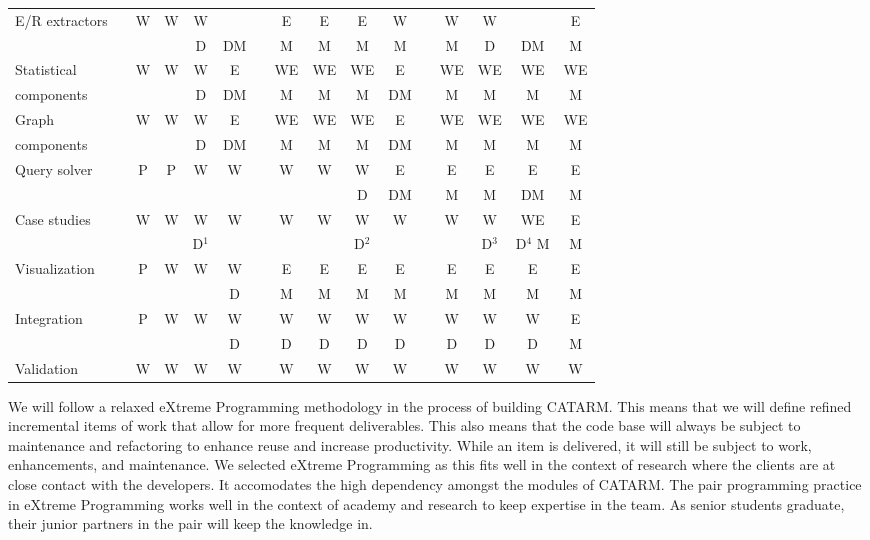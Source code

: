 \documentclass[12pt]{article}
\begin{document}
\begin{table}[bt]
\begin{tabular}{lp{.1cm}ccccp{.1cm}ccccp{.1cm}cccc}
\multirow{2}{*}{E/R extractors} & & 
W & W & W &  & & E & E & E & W & & W & W &  & E \\ 
& & 
 &  & D & DM & & M & M & M & M & & M & D & DM & M \\ \hline

Statistical & & 
W & W & W & E & & WE & WE & WE & E & & WE & WE & WE & WE \\ 
components & & 
 &  & D & DM & & M & M & M & DM & & M & M & M & M \\ \hline

Graph  & & 
W & W & W & E & & WE & WE & WE & E & & WE & WE & WE & WE \\ 
components & & 
 &  & D & DM & & M & M & M & DM & & M & M & M & M \\ \hline

\multirow{2}{*}{Query solver} & & 
P & P & W & W & & W & W & W & E & & E & E & E & E \\ 
& & 
 &  &  &  & &  &  & D & DM & & M & M & DM & M \\ \hline

\multirow{2}{*}{Case studies} & & 
W & W & W & W & & W & W & W & W & & W & W & WE & E \\ 
& & 
 &  & D$^1$ &  & &  &  & D$^2$ &  & &  & D$^3$ & D$^4$ M & M \\ \hline

\multirow{2}{*}{Visualization} & & 
P & W & W & W & & E & E & E & E & & E & E & E & E \\ 
& & 
 &  &  & D & & M & M & M & M & & M & M & M & M \\ \hline

\multirow{2}{*}{Integration} & & 
P & W & W & W & & W & W & W & W & & W & W & W & E \\ 
& & 
 &  &  & D & & D & D & D & D & & D & D & D & M \\  \hline

Validation & & 
W & W & W & W & & W & W & W & W & & W & W & W & W \\  \bottomrule
\end{tabular}
\normalsize
\label{t:workplan}
\end{table}

We will follow a relaxed  eXtreme Programming 
methodology in the process of building CATARM.
This means that we will define refined incremental items of 
work that allow for more frequent deliverables. 
This also means that the code base will always be subject
to maintenance and refactoring to enhance reuse and 
increase productivity. 
While an item is delivered, it will still be subject to work,
enhancements, and maintenance. 
We selected eXtreme Programming as this fits well in the 
context of research where the clients are at close 
contact with the developers.
It accomodates the high dependency amongst the 
modules of CATARM. 
The pair programming practice in eXtreme Programming 
works well in the context of academy and research to keep
expertise in the team. 
As senior students graduate, their junior partners in the pair
will keep the knowledge in. 
\end{document}
